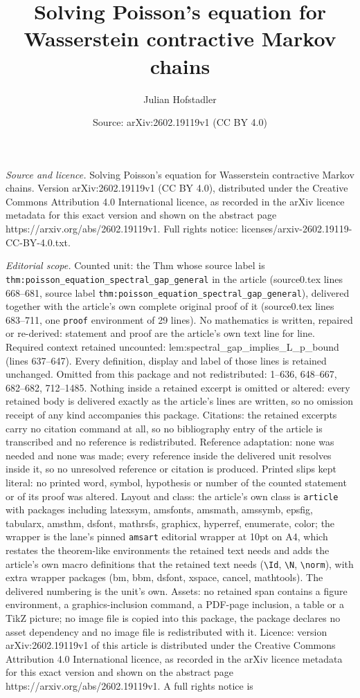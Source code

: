 \documentclass[10pt,a4paper]{amsart}
\title[Solving Poisson's equation for Wasserstein contractive Marko]{Solving Poisson's equation for Wasserstein contractive Markov chains}
\author{Julian Hofstadler}
\date{Source: arXiv:2602.19119v1 (CC BY 4.0)}
\begin{document}
\maketitle

\noindent\emph{Source and licence.} Solving Poisson's equation for Wasserstein contractive Markov chains. Version arXiv:2602.19119v1 (CC BY 4.0), distributed under the Creative Commons Attribution 4.0 International licence, as recorded in the arXiv licence metadata for this exact version and shown on the abstract page https://arxiv.org/abs/2602.19119v1. Full rights notice: licenses/arxiv-2602.19119-CC-BY-4.0.txt.\par\smallskip

\noindent\textit{Editorial scope.} Counted unit: the Thm whose source label is \texttt{thm:poisson\_equation\_spectral\_gap\_general} in the article (source0.tex lines 668--681, source label \texttt{thm:poisson\_equation\_spectral\_gap\_general}), delivered together with the article's own complete original proof of it (source0.tex lines 683--711, one \texttt{proof} environment of 29 lines). No mathematics is written, repaired or re-derived: statement and proof are the article's own text line for line. Required context retained uncounted: lem:spectral\_gap\_implies\_L\_p\_bound (lines 637--647). Every definition, display and label of those lines is retained unchanged. Omitted from this package and not redistributed: 1--636, 648--667, 682--682, 712--1485. Nothing inside a retained excerpt is omitted or altered: every retained body is delivered exactly as the article's lines are written, so no omission receipt of any kind accompanies this package. Citations: the retained excerpts carry no citation command at all, so no bibliography entry of the article is transcribed and no reference is redistributed. Reference adaptation: none was needed and none was made; every reference inside the delivered unit resolves inside it, so no unresolved reference or citation is produced. Printed slips kept literal: no printed word, symbol, hypothesis or number of the counted statement or of its proof was altered. Layout and class: the article's own class is \texttt{article} with packages including latexsym, amsfonts, amsmath, amssymb, epsfig, tabularx, amsthm, dsfont, mathrsfs, graphicx, hyperref, enumerate, color; the wrapper is the lane's pinned \texttt{amsart} editorial wrapper at 10pt on A4, which restates the theorem-like environments the retained text needs and adds the article's own macro definitions that the retained text needs (\texttt{\textbackslash Id}, \texttt{\textbackslash N}, \texttt{\textbackslash norm}), with extra wrapper packages (bm, bbm, dsfont, xspace, cancel, mathtools). The delivered numbering is the unit's own. Assets: no retained span contains a figure environment, a graphics-inclusion command, a PDF-page inclusion, a table or a TikZ picture; no image file is copied into this package, the package declares no asset dependency and no image file is redistributed with it. Licence: version arXiv:2602.19119v1 of this article is distributed under the Creative Commons Attribution 4.0 International licence, as recorded in the arXiv licence metadata for this exact version and shown on the abstract page https://arxiv.org/abs/2602.19119v1. A full rights notice is 
\end{document}
